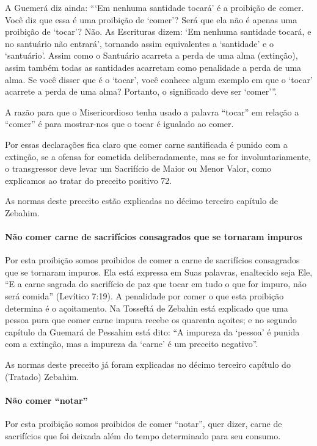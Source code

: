 A Guemerá diz ainda: ```Em nenhuma santidade tocará' é a proibição de
comer. Você diz que essa é uma proibição de `comer'? Será que ela não é
apenas uma proibição de `tocar'? Não. As Escrituras dizem: `Em nenhuma
santidade tocará, e no santuário não entrará', tornando assim
equivalentes a `santidade' e o `santuário'. Assim como o Santuário
acarreta a perda de uma alma (extinção), assim também todas as
santidades acarretam como penalidade a perda de uma alma. Se você disser
que é o `tocar', você conhece algum exemplo em que o `tocar' acarrete a
perda de uma alma? Portanto, o significado deve ser `comer'''.

A razão para que o Misericordioso tenha usado a palavra ``tocar'' em
relação a ``comer'' é para mostrar-nos que o tocar é igualado ao comer.

Por essas declarações fica claro que comer carne santificada é punido
com a extinção, se a ofensa for cometida deliberadamente, mas se for
involuntariamente, o transgressor deve levar um Sacrifício de Maior ou
Menor Valor, como explicamos ao tratar do preceito positivo 72.

As normas deste preceito estão explicadas no décimo terceiro capítulo
de Zebahim.

\paragraph{Não comer carne de sacrifícios consagrados que se tornaram impuros}

Por esta proibição somos proibidos de comer a carne de sacrifícios
consagrados que se tornaram impuros. Ela está expressa em Suas palavras,
enaltecido seja Ele, ``E a carne sagrada do sacrifício de paz que tocar
em tudo o que for impuro, não será comida'' (Levítico 7:19). A
penalidade por comer o que esta proibição determina é o açoitamento. Na
Tosseftá de Zebahin está explicado que uma pessoa pura que comer carne
impura recebe os quarenta açoites; e no segundo capítulo da Guemará de Pessahim está dito: ``A
impureza da `pessoa' é punida com a extinção, mas a impureza da `carne'
é um preceito negativo''.

As normas deste preceito já foram explicadas no décimo terceiro capítulo
do (Tratado) Zebahim.

\paragraph{Não comer ``notar''}

Por esta proibição somos proibidos de comer ``notar'', quer dizer, carne
de sacrifícios que foi deixada além do tempo determinado para seu
consumo.

